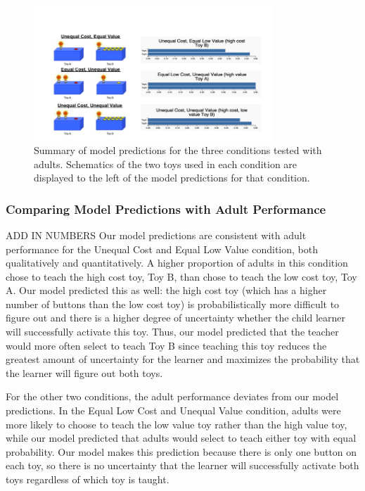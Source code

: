 \documentclass[10pt,letterpaper]{article}
\begin{document}
\begin{figure}[ht]
\begin{center}
\includegraphics[width=9cm]{modelPredictions.png}
\end{center}
\caption{Summary of model predictions for the three conditions tested with adults. Schematics of the two toys used in each condition are displayed to the left of the model predictions for that condition.} 
\label{Figure 2}
\end{figure}

\subsubsection{Comparing Model Predictions with Adult Performance}
ADD IN NUMBERS
Our model predictions are consistent with adult performance for the Unequal Cost and Equal Low Value condition, both qualitatively and quantitatively. A higher proportion of adults in this condition chose to teach the high cost toy, Toy B, than chose to teach the low cost toy, Toy A. Our model predicted this as well: the high cost toy (which has a higher number of buttons than the low cost toy) is probabilistically more difficult to figure out and there is a higher degree of uncertainty whether the child learner will successfully activate this toy. Thus, our model predicted that the teacher would more often select to teach Toy B since teaching this toy reduces the greatest amount of uncertainty for the learner and maximizes the probability that the learner will figure out both toys. 

For the other two conditions, the adult performance deviates from our model predictions. In the Equal Low Cost and Unequal Value condition, adults were more likely to choose to teach the low value toy rather than the high value toy, while our model predicted that adults would select to teach either toy with equal probability. Our model makes this prediction because there is only one button on each toy, so there is no uncertainty that the learner will successfully activate both toys regardless of which toy is taught.
\end{document}
